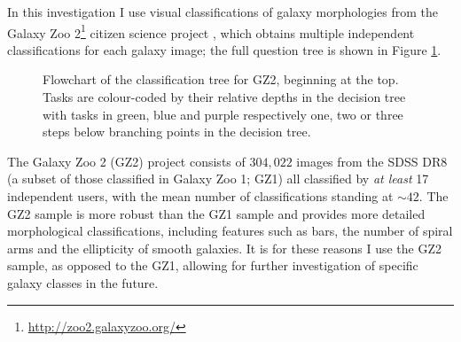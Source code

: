 In this investigation I use visual classifications of galaxy morphologies from the Galaxy Zoo 2\footnote{\url{http://zoo2.galaxyzoo.org/}} citizen science project \citep{GZ2}, which obtains multiple independent classifications for each galaxy image; the full question tree is shown in Figure \ref{tree}.  

\begin{figure}
\caption[GZ2 classification decision tree]{Flowchart of the classification tree for GZ2, beginning at the top. Tasks are colour-coded by their relative depths in the decision tree with tasks in green, blue and purple respectively one, two or three steps below branching points in the decision tree.}
\label{tree}
\end{figure}

The Galaxy Zoo 2 (GZ2) project consists of $304, 022$ images from the SDSS DR8 (a subset of those classified in Galaxy Zoo 1; GZ1) all classified by \emph{at least} 17 independent users, with the mean number of classifications standing at $\sim42$. The GZ2 sample is more robust than the GZ1 sample and provides more detailed morphological classifications, including features such as bars, the number of spiral arms and the ellipticity of smooth galaxies. It is for these reasons I use the GZ2 sample, as opposed to the GZ1, allowing for further investigation of specific galaxy classes in the future. 

